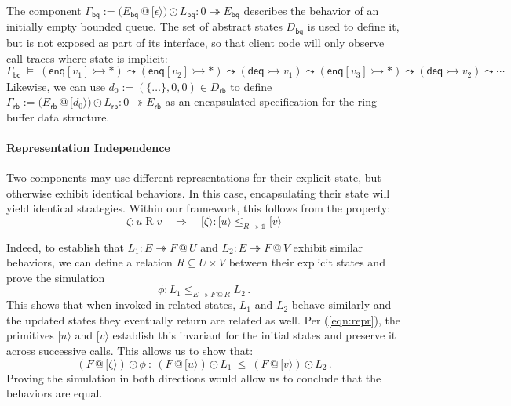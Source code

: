 \documentclass[acmsmall,nonacm]{acmart}
\newcommand{\kw}[1]{\ensuremath{ \mathsf{#1} }}
\newcommand{\emptysig}{0}
\newcommand{\mathbbm}[1]{\mathds{#1}}
\begin{document}
\begin{example} \label{ex:encaps} %
The component
$\Gamma_\kw{bq} :=
 \bigl(E_\kw{bq} \mathbin@ [\epsilon\rangle\bigr) \odot L_\kw{bq} :
 \emptysig \twoheadrightarrow E_\kw{bq}$
describes the behavior of an initially empty bounded queue.
The set of abstract states $D_\kw{bq}$ is used to define it,
but is not exposed as part of its interface,
so that client code will only observe call traces
where state is implicit:
{\small\[
  \Gamma_\kw{bq} \: \vDash \:
    (\kw{enq}[v_1] \rightarrowtail {*}) \leadsto
    (\kw{enq}[v_2] \rightarrowtail {*}) \leadsto
    (\kw{deq} \rightarrowtail v_1) \leadsto
    (\kw{enq}[v_3] \rightarrowtail {*}) \leadsto
    (\kw{deq} \rightarrowtail v_2) \leadsto \cdots
\]}%
Likewise,
we can use
$d_0 := (\{\ldots\}, 0, 0) \in D_\kw{rb}$
to define
$\Gamma_\kw{rb} :=
 \bigl( E_\kw{rb} \mathbin@ [d_0\rangle \bigr) \odot L_\kw{rb} :
 \emptysig \twoheadrightarrow E_\kw{rb}$
as an encapsulated specification for
the ring buffer data structure.
\end{example}

\paragraph{Representation Independence} %

Two components may use different representations
for their explicit state,
but otherwise exhibit identical behaviors.
In this case,
encapsulating their state will yield identical strategies.
Within our framework,
this follows from the property:
\begin{equation} \label{eqn:repr}
  \zeta : u \mathbin{R} v
  \quad\Longrightarrow\quad
  [\zeta\rangle : [u\rangle \le_{R \twoheadrightarrow \mathbbm{1}} [v\rangle
\end{equation}

Indeed,
to establish that
$L_1 : E \twoheadrightarrow F \mathbin@ U$ and
$L_2 : E \twoheadrightarrow F \mathbin@ V$
exhibit similar behaviors,
we can define a relation $R \subseteq U \times V$
between their explicit states and prove the simulation
\[
  \phi : L_1 \le_{E \twoheadrightarrow F \mathbin@ R} L_2
  \,.
\]
This shows that when invoked in related states,
$L_1$ and $L_2$ behave similarly and
the updated states they eventually return are related as well.
Per (\ref{eqn:repr}),
the primitives $[u\rangle$ and $[v\rangle$
establish this invariant for the initial states
and preserve it across successive calls.
This allows us to show that:
\[
  (F \mathbin@ [\zeta\rangle) \odot \phi \: : \:
  (F \mathbin@ [u\rangle) \odot L_1 \: \le \:
  (F \mathbin@ [v\rangle) \odot L_2
  \,.
\]
Proving the simulation in both directions
would allow us to conclude that the behaviors are equal.
\end{document}
